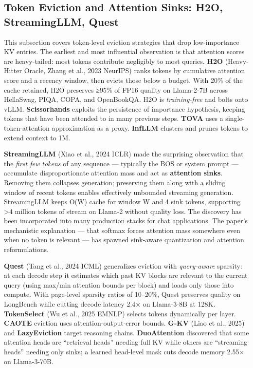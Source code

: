 \documentclass{article}
\begin{document}
\subsection{Token Eviction and Attention Sinks: H2O, StreamingLLM, Quest}\label{token-eviction-and-attention-sinks-h2o-streamingllm-quest}

This subsection covers token-level eviction strategies that drop low-importance KV entries. The earliest and most influential observation is that attention scores are heavy-tailed: most tokens contribute negligibly to most queries. \textbf{H2O} (Heavy-Hitter Oracle, Zhang et al., 2023 NeurIPS) ranks tokens by cumulative attention score and a recency window, then evicts those below a budget. With 20\% of the cache retained, H2O preserves ≥95\% of FP16 quality on Llama-2-7B across HellaSwag, PIQA, COPA, and OpenBookQA. H2O is \emph{training-free} and bolts onto vLLM. \textbf{Scissorhands} \citep{liu20242024} exploits the persistence of importance hypothesis, keeping tokens that have been attended to in many previous steps. \textbf{TOVA} uses a single-token-attention approximation as a proxy. \textbf{InfLLM} clusters and prunes tokens to extend context to 1M.

\textbf{StreamingLLM} (Xiao et al., 2024 ICLR) made the surprising observation that the \emph{first few tokens} of any sequence --- typically the BOS or system prompt --- accumulate disproportionate attention mass and act as \textbf{attention sinks}. Removing them collapses generation; preserving them along with a sliding window of recent tokens enables effectively unbounded streaming generation. StreamingLLM keeps O(W) cache for window W and 4 sink tokens, supporting \textgreater4 million tokens of stream on Llama-2 without quality loss. The discovery has been incorporated into many production stacks for chat applications. The paper's mechanistic explanation --- that softmax forces attention mass somewhere even when no token is relevant --- has spawned sink-aware quantization and attention reformulations.

\textbf{Quest} (Tang et al., 2024 ICML) generalizes eviction with \emph{query-aware} sparsity: at each decode step it estimates which past KV blocks are relevant to the current query (using max/min attention bounds per block) and loads only those into compute. With page-level sparsity ratios of 10--20\%, Quest preserves quality on LongBench while cutting decode latency 2.4× on Llama-3-8B at 128K. \textbf{TokenSelect} (Wu et al., 2025 EMNLP) selects tokens dynamically per layer. \textbf{CAOTE} \citep{goel20252025} eviction uses attention-output-error bounds. \textbf{G-KV} (Liao et al., 2025) and \textbf{LazyEviction} \citep{zhang20252025} target reasoning chains. \textbf{DuoAttention} \citep{xiao2024efficientstreaming} discovered that some attention heads are ``retrieval heads'' needing full KV while others are ``streaming heads'' needing only sinks; a learned head-level mask cuts decode memory 2.55× on Llama-3-70B.
\end{document}
